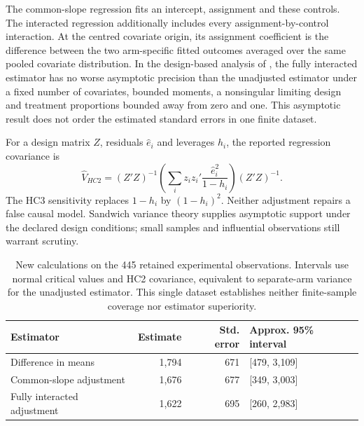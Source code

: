 The common-slope regression fits an intercept, assignment and these controls.
The interacted regression additionally includes every assignment-by-control
interaction. At the centred covariate origin, its assignment coefficient is
the difference between the two arm-specific fitted outcomes averaged over
the same pooled covariate distribution. In the design-based analysis of
\citet{gap29lin}, the fully interacted estimator has no worse asymptotic
precision than the unadjusted estimator under a fixed number of covariates,
bounded moments, a nonsingular limiting design and treatment proportions
bounded away from zero and one. This asymptotic result does not order the
estimated standard errors in one finite dataset.

For a design matrix $Z$, residuals $\widehat e_i$ and leverages $h_i$, the
reported regression covariance is
\[
 \widehat V_{HC2}=(Z'Z)^{-1}
 \left(\sum_i z_i z_i'\frac{\widehat e_i^2}{1-h_i}\right)(Z'Z)^{-1}.
\]
The HC3 sensitivity replaces $1-h_i$ by $(1-h_i)^2$. Neither adjustment
repairs a false causal model. Sandwich variance theory supplies asymptotic
support under the declared design conditions; small samples and influential
observations still warrant scrutiny. \citep{gap29lin}




\begin{table}[htbp]
\centering\small
\begin{tabular}{lrrl}
\toprule
Estimator & Estimate & Std. error & Approx. 95\% interval \\
\midrule
Difference in means & 1,794 & 671 & [479, 3,109] \\
Common-slope adjustment & 1,676 & 677 & [349, 3,003] \\
Fully interacted adjustment & 1,622 & 695 & [260, 2,983] \\
\bottomrule
\end{tabular}
\caption{New calculations on the 445 retained experimental observations.
Intervals use normal critical values and HC2 covariance, equivalent to
separate-arm variance for the unadjusted estimator. This single dataset
establishes neither finite-sample coverage nor estimator superiority.}
\end{table}




